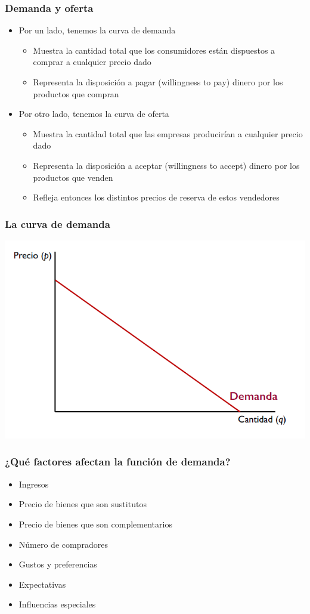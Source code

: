 \documentclass{beamer}
\begin{document}
\begin{frame}
\frametitle{Demanda y oferta}
\begin{itemize}
    \item Por un lado, tenemos la curva de demanda
    \begin{itemize}
        \item Muestra la cantidad total que los consumidores están dispuestos a comprar a cualquier precio dado
        \item Representa la disposición a pagar (willingness to pay) dinero por los productos que compran
    \end{itemize}
    \vspace{2mm}
    \item Por otro lado, tenemos la curva de oferta
    \begin{itemize}
        \item Muestra la cantidad total que las empresas producirían a cualquier precio dado
        \item Representa la disposición a aceptar (willingness to accept) dinero por los productos que venden
        \item Refleja entonces los distintos precios de reserva de estos vendedores
        \end{itemize}
\end{itemize}
\end{frame}

\begin{frame}
\frametitle{ La curva de demanda}
\includegraphics[scale=0.6]{Figures/Tema_07.1_curvadeldemanda.png}
\end{frame}

\begin{frame}
\frametitle{¿Qué factores afectan la función de demanda?}
\begin{itemize}
    \item Ingresos
    \item Precio de bienes que son sustitutos
    \item Precio de bienes que son complementarios
    \item Número de compradores
    \item Gustos y preferencias
    \item Expectativas
    \item Influencias especiales
\end{itemize}
\end{frame}
\end{document}
